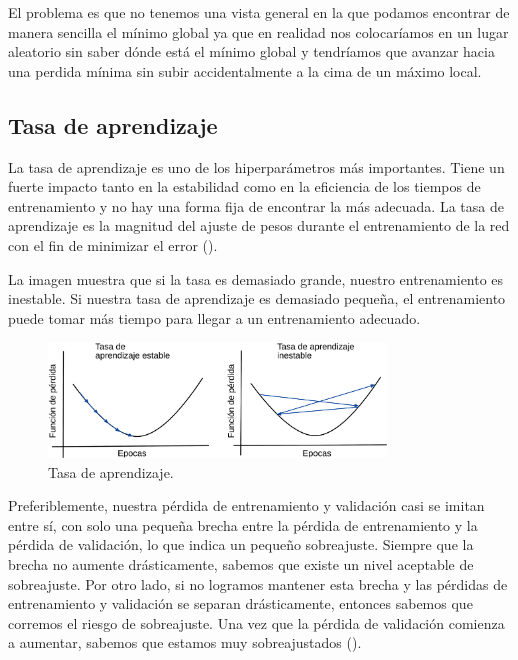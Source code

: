 El problema es que no tenemos una vista general en la que podamos encontrar de manera sencilla el mínimo global ya que en realidad nos colocaríamos en un lugar aleatorio sin saber dónde está el mínimo global y tendríamos que avanzar hacia una perdida mínima sin subir accidentalmente a la cima de un máximo local.

\subsection{Tasa de aprendizaje}

La tasa de aprendizaje es uno de los hiperparámetros más importantes. Tiene un fuerte impacto tanto en la estabilidad como en la eficiencia de los tiempos de entrenamiento y no hay una forma fija de encontrar la más adecuada. La tasa de aprendizaje es la magnitud del ajuste de pesos durante el entrenamiento de la red con el fin de minimizar el error (\cite{valenzuela2020Sistema}).

La imagen muestra que si la tasa es demasiado grande, nuestro entrenamiento es inestable. Si nuestra tasa de aprendizaje es demasiado pequeña, el entrenamiento puede tomar más tiempo para llegar a un entrenamiento adecuado.

\begin{figure}[H]
    \centering
    \includegraphics[width=0.8\textwidth]{MarcoTeorico/imgs/LearningRate.png}
    \caption{Tasa de aprendizaje.}
    \label{fig:learningRate}
\end{figure}

Preferiblemente, nuestra pérdida de entrenamiento y validación casi se imitan entre sí, con solo una pequeña brecha entre la pérdida de entrenamiento y la pérdida de validación, lo que indica un pequeño sobreajuste. Siempre que la brecha no aumente drásticamente, sabemos que existe un nivel aceptable de sobreajuste. Por otro lado, si no logramos mantener esta brecha y las pérdidas de entrenamiento y validación se separan drásticamente, entonces sabemos que corremos el riesgo de sobreajuste. Una vez que la pérdida de validación comienza a aumentar, sabemos que estamos muy sobreajustados (\cite{rosebrock2017deep}).


